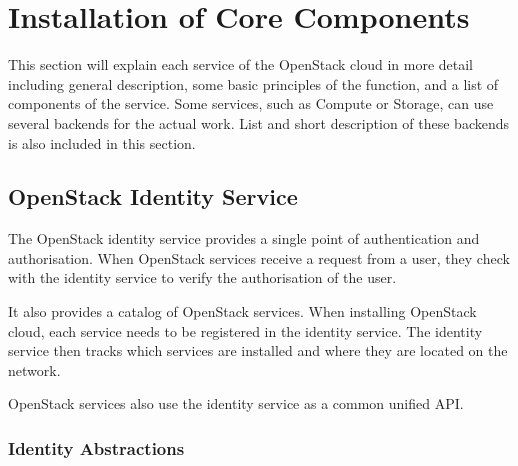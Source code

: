 \section{Installation of Core Components}

This section will explain each service of the OpenStack cloud in more detail including general description, some basic principles of the function, and a list of components of the service. Some services, such as Compute or Storage, can use several backends for the actual work. List and short description of these backends is also included in this section.


\subsection{OpenStack Identity Service}
The OpenStack identity service provides a single point of authentication and authorisation. When OpenStack services receive a request from a user, they check with the identity service to verify the authorisation of the user.

It also provides a catalog of OpenStack services. When installing OpenStack cloud, each service needs to be registered in the identity service. The identity service then tracks which services are installed and where they are located on the network.

OpenStack services also use the identity service as a common unified API.

\subsubsection*{Identity Abstractions}

